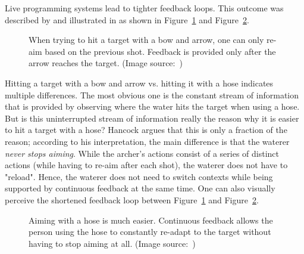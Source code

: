 Live programming systems lead to tighter feedback loops.
This outcome was described by \citeauthor{hancock_real-time_2003} \cite{hancock_real-time_2003} and illustrated in \cite{aguiar_live_2019} as shown in Figure~\ref{fig:bow-arrow} and Figure~\ref{fig:waterhose}.
%
\begin{figure}[h]
\centering

\caption{When trying to hit a target with a bow and arrow, one can only re-aim based on the previous shot. Feedback is provided only after the arrow reaches the target. (Image source:~\cite{aguiar_live_2019})}
\label{fig:bow-arrow}
\end{figure}
%
Hitting a target with a bow and arrow vs. hitting it with a hose indicates multiple differences.
The most obvious one is the constant stream of information that is provided by observing where the water hits the target when using a hose.
But is this uninterrupted stream of information really the reason why it is easier to hit a target with a hose?
Hancock \cite{hancock_real-time_2003} argues that this is only a fraction of the reason; according to his interpretation, the main difference is that the waterer \emph{never stops aiming}.
While the archer's actions consist of a series of distinct actions (while having to re-aim after each shot), the waterer does not have to "reload".
Hence, the waterer does not need to switch contexts while being supported by continuous feedback at the same time.
One can also visually perceive the shortened feedback loop between Figure~\ref{fig:bow-arrow} and Figure~\ref{fig:waterhose}.

\begin{figure}[h]
\centering

\caption{Aiming with a hose is much easier. Continuous feedback allows the person using the hose to constantly re-adapt to the target without having to stop aiming at all. (Image source:~\cite{aguiar_live_2019})}
\label{fig:waterhose}
\end{figure}

